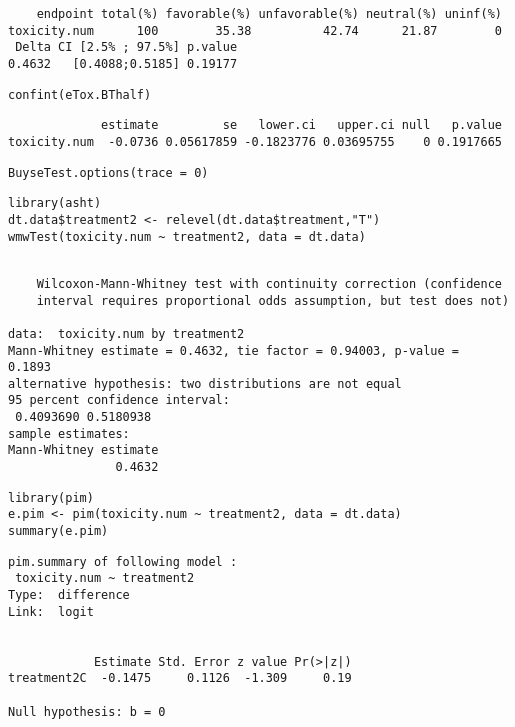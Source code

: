 \documentclass[12pt]{article}
\begin{document}
\begin{verbatim}
    endpoint total(%) favorable(%) unfavorable(%) neutral(%) uninf(%)
toxicity.num      100        35.38          42.74      21.87        0
 Delta CI [2.5% ; 97.5%] p.value
0.4632   [0.4088;0.5185] 0.19177
\end{verbatim}


\lstset{language=r,label= ,caption= ,captionpos=b,numbers=none}
\begin{lstlisting}
confint(eTox.BThalf)
\end{lstlisting}

\begin{verbatim}
             estimate         se   lower.ci   upper.ci null   p.value
toxicity.num  -0.0736 0.05617859 -0.1823776 0.03695755    0 0.1917665
\end{verbatim}



\lstset{language=r,label= ,caption= ,captionpos=b,numbers=none}
\begin{lstlisting}
BuyseTest.options(trace = 0)
\end{lstlisting}

\lstset{language=r,label= ,caption= ,captionpos=b,numbers=none}
\begin{lstlisting}
library(asht)
dt.data$treatment2 <- relevel(dt.data$treatment,"T")
wmwTest(toxicity.num ~ treatment2, data = dt.data)
\end{lstlisting}

\begin{verbatim}

	Wilcoxon-Mann-Whitney test with continuity correction (confidence
	interval requires proportional odds assumption, but test does not)

data:  toxicity.num by treatment2
Mann-Whitney estimate = 0.4632, tie factor = 0.94003, p-value =
0.1893
alternative hypothesis: two distributions are not equal
95 percent confidence interval:
 0.4093690 0.5180938
sample estimates:
Mann-Whitney estimate 
               0.4632
\end{verbatim}


\lstset{language=r,label= ,caption= ,captionpos=b,numbers=none}
\begin{lstlisting}
library(pim)
e.pim <- pim(toxicity.num ~ treatment2, data = dt.data)
summary(e.pim)
\end{lstlisting}

\begin{verbatim}
pim.summary of following model : 
 toxicity.num ~ treatment2
Type:  difference 
Link:  logit 


            Estimate Std. Error z value Pr(>|z|)
treatment2C  -0.1475     0.1126  -1.309     0.19

Null hypothesis: b = 0
\end{verbatim}
\end{document}
